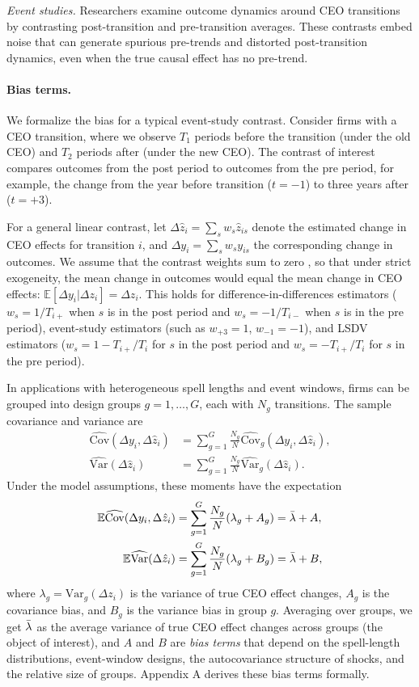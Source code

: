 \documentclass[11pt,a4paper]{article}
\newcommand{\Var}{\text{Var}}
\newcommand{\Cov}{\text{Cov}}
\begin{document}
\textit{Event studies.} Researchers examine outcome dynamics around CEO transitions by contrasting post-transition and pre-transition averages. These contrasts embed noise that can generate spurious pre-trends and distorted post-transition dynamics, even when the true causal effect has no pre-trend.

\paragraph{Bias terms.} We formalize the bias for a typical event-study contrast. Consider firms with a CEO transition, where we observe $T_1$ periods before the transition (under the old CEO) and $T_2$ periods after (under the new CEO). The contrast of interest compares outcomes from the post period to outcomes from the pre period, for example, the change from the year before transition ($t=-1$) to three years after ($t=+3$). 

For a general linear contrast, let $\Delta \hat z_i = \sum_s w_s \hat z_{is}$ denote the estimated change in CEO effects for transition $i$, and $\Delta y_i = \sum_s w_s y_{is}$ the corresponding change in outcomes. We assume that the contrast weights sum to zero , so that under strict exogeneity, the mean change in outcomes would equal the mean change in CEO effects: $\mathbb E[\Delta y_i|\Delta z_i] = \Delta z_i$. This holds for difference-in-differences estimators ($w_s = 1/T_{i+}$ when $s$ is in the post period and $w_s = -1/T_{i-}$ when $s$ is in the pre period), event-study estimators (such as $w_{+3}=1$, $w_{-1}=-1$), and LSDV estimators ($w_s = 1-T_{i+}/T_i$ for $s$ in the post period and $w_s = -T_{i+}/T_i$ for $s$ in the pre period).

In applications with heterogeneous spell lengths and event windows, firms can be grouped into design groups $g=1,\ldots,G$, each with $N_g$ transitions. The sample covariance and variance are
\begin{align}
\widehat{\Cov}(\Delta y_i,\Delta \hat z_i) &= \sum_{g=1}^G \frac{N_g}{N} \widehat{\Cov}_g(\Delta y_i,\Delta \hat z_i),\\
\widehat{\Var}(\Delta \hat z_i) &= \sum_{g=1}^G \frac{N_g}{N} \widehat{\Var}_g(\Delta \hat z_i).
\end{align}
Under the model assumptions, these moments have the expectation
\begin{align}
\mathbb E\widehat{\Cov}(\Delta y_i,\Delta \hat z_i) &= 
  \sum_{g=1}^G \frac{N_g}{N} (\lambda_g + A_g) = \Bar\lambda + A,\\
\mathbb E\widehat{\Var}(\Delta \hat z_i) &= 
\sum_{g=1}^G \frac{N_g}{N} (\lambda_g + B_g) = \Bar\lambda + B,
\end{align}
where $\lambda_g = \Var_g(\Delta z_i)$ is the variance of true CEO effect changes, $A_g$ is the covariance bias, and $B_g$ is the variance bias in group $g$. Averaging over groups, we get $\Bar\lambda$ as the average variance of true CEO effect changes across groups (the object of interest), and $A$ and $B$ are \emph{bias terms} that depend on the spell-length distributions, event-window designs, the autocovariance structure of shocks, and the relative size of groups. Appendix A derives these bias terms formally.
\end{document}
